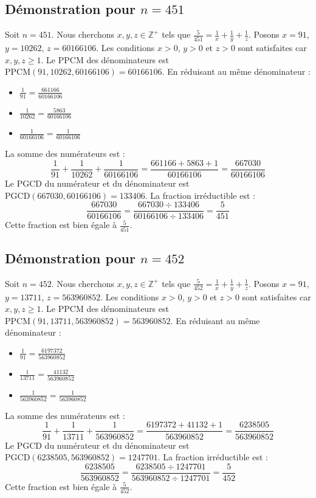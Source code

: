 \documentclass[11pt,a4paper]{article}
\begin{document}
\subsection{Démonstration pour $n = 451$}
Soit $n = 451$. Nous cherchons $x, y, z \in \mathbb{Z}^{+}$ tels que $\frac{5}{451} = \frac{1}{x} + \frac{1}{y} + \frac{1}{z}$.
Posons $x = 91$, $y = 10262$, $z = 60166106$.
Les conditions $x > 0$, $y > 0$ et $z > 0$ sont satisfaites car $x, y, z \geq 1$.
Le PPCM des dénominateurs est $\text{PPCM}(91, 10262, 60166106) = 60166106$.
En réduisant au même dénominateur :
\begin{itemize}
    \item $\frac{1}{91} = \frac{661166}{60166106}$
    \item $\frac{1}{10262} = \frac{5863}{60166106}$
    \item $\frac{1}{60166106} = \frac{1}{60166106}$
\end{itemize}
La somme des numérateurs est :
$$ \frac{1}{91} + \frac{1}{10262} + \frac{1}{60166106} = \frac{661166 + 5863 + 1}{60166106} = \frac{667030}{60166106} $$
Le PGCD du numérateur et du dénominateur est $\text{PGCD}(667030, 60166106) = 133406$.
La fraction irréductible est :
$$ \frac{667030}{60166106} = \frac{667030 \div 133406}{60166106 \div 133406} = \frac{5}{451} $$
Cette fraction est bien égale à $\frac{5}{451}$.

\subsection{Démonstration pour $n = 452$}
Soit $n = 452$. Nous cherchons $x, y, z \in \mathbb{Z}^{+}$ tels que $\frac{5}{452} = \frac{1}{x} + \frac{1}{y} + \frac{1}{z}$.
Posons $x = 91$, $y = 13711$, $z = 563960852$.
Les conditions $x > 0$, $y > 0$ et $z > 0$ sont satisfaites car $x, y, z \geq 1$.
Le PPCM des dénominateurs est $\text{PPCM}(91, 13711, 563960852) = 563960852$.
En réduisant au même dénominateur :
\begin{itemize}
    \item $\frac{1}{91} = \frac{6197372}{563960852}$
    \item $\frac{1}{13711} = \frac{41132}{563960852}$
    \item $\frac{1}{563960852} = \frac{1}{563960852}$
\end{itemize}
La somme des numérateurs est :
$$ \frac{1}{91} + \frac{1}{13711} + \frac{1}{563960852} = \frac{6197372 + 41132 + 1}{563960852} = \frac{6238505}{563960852} $$
Le PGCD du numérateur et du dénominateur est $\text{PGCD}(6238505, 563960852) = 1247701$.
La fraction irréductible est :
$$ \frac{6238505}{563960852} = \frac{6238505 \div 1247701}{563960852 \div 1247701} = \frac{5}{452} $$
Cette fraction est bien égale à $\frac{5}{452}$.
\end{document}
